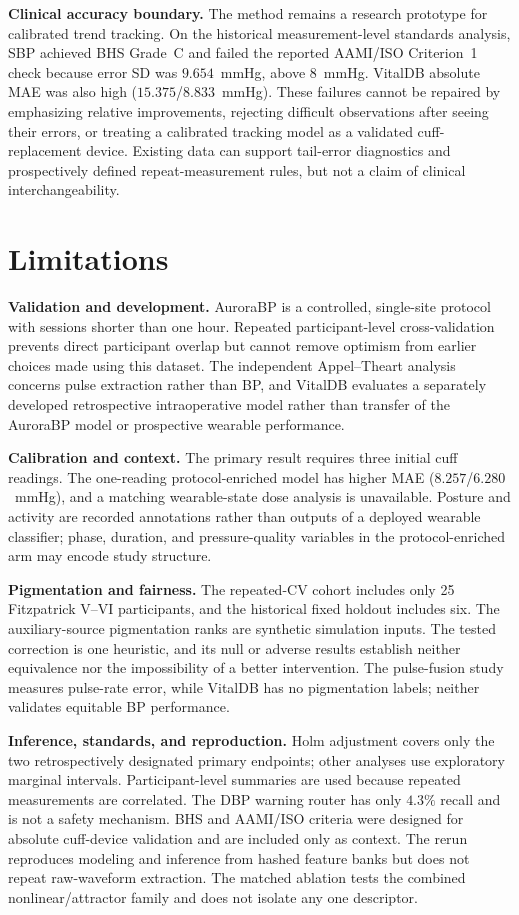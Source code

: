 \documentclass[12pt]{article}
\begin{document}
\textbf{Clinical accuracy boundary.} The method remains a research prototype for calibrated trend tracking. On the historical measurement-level standards analysis, SBP achieved BHS Grade~C and failed the reported AAMI/ISO Criterion~1 check because error SD was $9.654$~mmHg, above $8$~mmHg. VitalDB absolute MAE was also high ($15.375$/$8.833$~mmHg). These failures cannot be repaired by emphasizing relative improvements, rejecting difficult observations after seeing their errors, or treating a calibrated tracking model as a validated cuff-replacement device. Existing data can support tail-error diagnostics and prospectively defined repeat-measurement rules, but not a claim of clinical interchangeability.
\section{Limitations}
\label{sec:limitations}
\textbf{Validation and development.} AuroraBP is a controlled, single-site protocol with sessions shorter than one hour. Repeated participant-level cross-validation prevents direct participant overlap but cannot remove optimism from earlier choices made using this dataset. The independent Appel--Theart analysis concerns pulse extraction rather than BP, and VitalDB evaluates a separately developed retrospective intraoperative model rather than transfer of the AuroraBP model or prospective wearable performance.

\textbf{Calibration and context.} The primary result requires three initial cuff readings. The one-reading protocol-enriched model has higher MAE ($8.257$/$6.280$~mmHg), and a matching wearable-state dose analysis is unavailable. Posture and activity are recorded annotations rather than outputs of a deployed wearable classifier; phase, duration, and pressure-quality variables in the protocol-enriched arm may encode study structure.

\textbf{Pigmentation and fairness.} The repeated-CV cohort includes only 25 Fitzpatrick V--VI participants, and the historical fixed holdout includes six. The auxiliary-source pigmentation ranks are synthetic simulation inputs. The tested correction is one heuristic, and its null or adverse results establish neither equivalence nor the impossibility of a better intervention. The pulse-fusion study measures pulse-rate error, while VitalDB has no pigmentation labels; neither validates equitable BP performance.

\textbf{Inference, standards, and reproduction.} Holm adjustment covers only the two retrospectively designated primary endpoints; other analyses use exploratory marginal intervals. Participant-level summaries are used because repeated measurements are correlated. The DBP warning router has only $4.3\%$ recall and is not a safety mechanism. BHS and AAMI/ISO criteria were designed for absolute cuff-device validation and are included only as context. The rerun reproduces modeling and inference from hashed feature banks but does not repeat raw-waveform extraction. The matched ablation tests the combined nonlinear/attractor family and does not isolate any one descriptor.
\end{document}

